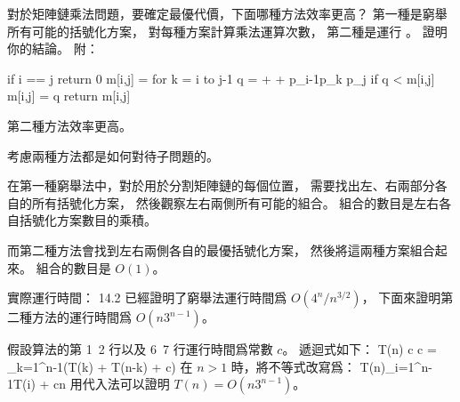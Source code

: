 \startEXERCISE
對於矩陣鏈乘法問題，要確定最優代價，下面哪種方法效率更高？
第一種是窮舉所有可能的括號化方案，
對每種方案計算乘法運算次數，
第二種是運行 。
證明你的結論。
附：

\startCLRSCODE
if i == j
	return 0
m[i,j] = \infty
for k = i to j-1
	q = 
		+ 
		+ p_{i-1}p_k p_j
	if q < m[i,j]
		m[i,j] = q
return m[i,j]
\stopCLRSCODE
\stopEXERCISE

\startANSWER
第二種方法效率更高。

考慮兩種方法都是如何對待子問題的。

在第一種窮舉法中，對於用於分割矩陣鏈的每個位置，
需要找出左、右兩部分各自的所有括號化方案，
然後觀察左右兩側所有可能的組合。
組合的數目是左右各自括號化方案數目的乘積。

而第二種方法會找到左右兩側各自的最優括號化方案，
然後將這兩種方案組合起來。
組合的數目是 $O(1)$。

實際運行時間：
 14.2 已經證明了窮舉法運行時間爲 $O(4^n / n^{3/2})$，
下面來證明第二種方法的運行時間爲 $O(n3^{n-1})$。

假設算法的第 1~2 行以及 6~7 行運行時間爲常數 $c$。
遞迴式如下：
\startformula
T(n) \le \startmathcases
\NC c \NC {} \NR
\NC c = \sum_{k=1}^{n-1}(T(k) + T(n-k) + c) \NC {} \NR
\stopmathcases
\stopformula
在 $n>1$ 時，將不等式改寫爲：
\startformula
T(n)\sum_{i=1}^{n-1}T(i) + cn
\stopformula
用代入法可以證明 $T(n)=O(n 3^{n-1})$。
\stopANSWER
